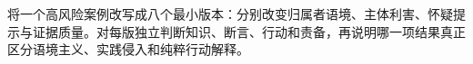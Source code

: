 \begin{tcolorbox}[breakable,colback=white,colframe=blue!30!black,title={专题研读任务},fonttitle=\bfseries]
将一个高风险案例改写成八个最小版本：分别改变归属者语境、主体利害、怀疑提示与证据质量。对每版独立判断知识、断言、行动和责备，再说明哪一项结果真正区分语境主义、实践侵入和纯粹行动解释。
\end{tcolorbox}

